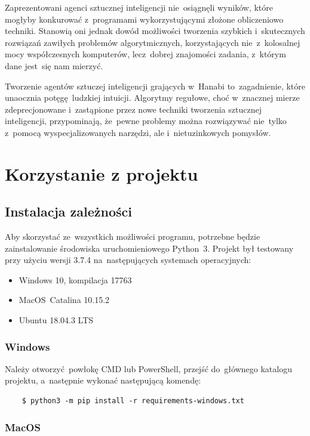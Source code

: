 \documentclass[declaration,shortabstract,inz]{iithesis}
\begin{document}
Zaprezentowani agenci sztucznej inteligencji nie~osiągnęli wyników, które mogłyby konkurować z~programami wykorzystującymi złożone obliczeniowo techniki. Stanowią oni jednak dowód możliwości tworzenia szybkich i~skutecznych rozwiązań zawiłych problemów algorytmicznych, korzystających nie~z~kolosalnej mocy współczesnych komputerów, lecz~dobrej znajomości zadania, z~którym dane jest~się nam mierzyć.

Tworzenie agentów sztuczej inteligencji grających w~Hanabi to~zagadnienie, które unaocznia potęgę ludzkiej intuicji. Algorytmy regułowe, choć w~znacznej mierze zdeprecjonowane i~zastąpione przez nowe techniki tworzenia sztucznej inteligencji, przypominają, że~pewne problemy można rozwiązywać nie~tylko z~pomocą wyspecjalizowanych narzędzi, ale i~nietuzinkowych pomysłów.

\appendix
\chapter{Korzystanie z projektu}

\section{Instalacja zależności}
Aby skorzystać ze~wszystkich możliwości programu, potrzebne będzie zainstalowanie środowiska uruchomieniowego Python~3. Projekt był testowany przy użyciu wersji 3.7.4 na~następujących systemach operacyjnych:
\begin{itemize}
	\item Windows 10, kompilacja 17763
	\item MacOS~Catalina 10.15.2
	\item Ubuntu 18.04.3 LTS
\end{itemize}

\subsection{Windows}

Należy otworzyć powłokę CMD lub PowerShell, przejść do~głównego katalogu projektu, a~następnie wykonać następującą komendę:
\begin{verbatim}
    $ python3 -m pip install -r requirements-windows.txt
\end{verbatim}

\subsection{MacOS}
\end{document}
